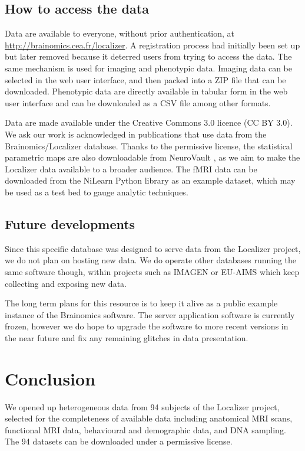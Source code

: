\documentclass[review]{elsarticle}
\begin{document}
\subsection{How to access the data}

Data are available to everyone, without prior authentication, at \url{http://brainomics.cea.fr/localizer}. A registration process had initially been set up but later removed because it deterred users from trying to access the data. The same mechanism is used for imaging and phenotypic data. Imaging data can be selected in the web user interface, and then packed into a ZIP file that can be downloaded. Phenotypic data are directly available in tabular form in the web user interface and can be downloaded as a CSV file among other formats.

Data are made available under the Creative Commons 3.0 licence (CC BY 3.0). We ask our work is acknowledged in publications that use data from the Brainomics/Localizer database. Thanks to the permissive license, the statistical parametric maps are also downloadable from NeuroVault \cite{NeuroVault2014}, as we aim to make the Localizer data available to a broader audience.
The fMRI data can be downloaded from the NiLearn Python library \cite{NiLearn} as an example dataset, which may be used as a test bed to gauge analytic techniques.


\subsection{Future developments}

Since this specific database was designed to serve data from the Localizer project, we do not plan on hosting new data. We do operate other databases running the same software though, within projects such as IMAGEN \cite{Imagen2010} or EU-AIMS \cite{Aims2014} which keep collecting and exposing new data.

The long term plans for this resource is to keep it alive as a public example instance of the {Brainomics} software. The server application software is currently frozen, however we do hope to upgrade the software to more recent versions in the near future and fix any remaining glitches in data presentation.


\section{Conclusion}

We opened up heterogeneous data from 94 subjects of the Localizer project, selected for the completeness of available data including anatomical MRI scans, functional MRI data, behavioural and demographic data, and DNA sampling. The 94 datasets can be downloaded under a permissive license.
\end{document}
